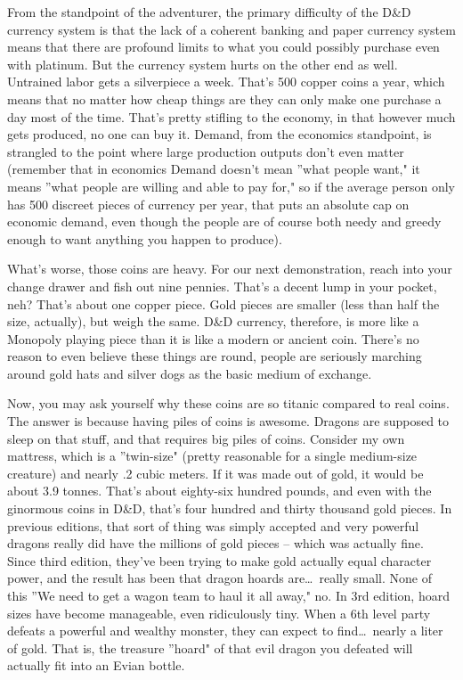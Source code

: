 From the standpoint of the adventurer, the primary difficulty of the D\&D currency system is that the lack of a coherent banking and paper currency system means that there are profound limits to what you could possibly purchase even with platinum. But the currency system hurts on the other end as well. Untrained labor gets a silverpiece a week. That's 500 copper coins a year, which means that no matter how cheap things are they can only make one purchase a day most of the time. That's pretty stifling to the economy, in that however much gets produced, no one can buy it. Demand, from the economics standpoint, is strangled to the point where large production outputs don't even matter (remember that in economics Demand doesn't mean ''what people want," it means ''what people are willing and able to pay for," so if the average person only has 500 discreet pieces of currency per year, that puts an absolute cap on economic demand, even though the people are of course both needy and greedy enough to want anything you happen to produce).

What's worse, those coins are heavy. For our next demonstration, reach into your change drawer and fish out nine pennies. That's a decent lump in your pocket, neh? That's about one copper piece. Gold pieces are smaller (less than half the size, actually), but weigh the same. D\&D currency, therefore, is more like a Monopoly playing piece than it is like a modern or ancient coin. There's no reason to even believe these things are round, people are seriously marching around gold hats and silver dogs as the basic medium of exchange.

Now, you may ask yourself why these coins are so titanic compared to real coins. The answer is because having piles of coins is awesome. Dragons are supposed to sleep on that stuff, and that requires big piles of coins. Consider my own mattress, which is a ''twin-size" (pretty reasonable for a single medium-size creature) and nearly .2 cubic meters. If it was made out of gold, it would be about 3.9 tonnes. That's about eighty-six hundred pounds, and even with the ginormous coins in D\&D, that's four hundred and thirty thousand gold pieces. In previous editions, that sort of thing was simply accepted and very powerful dragons really did have the millions of gold pieces -- which was actually fine. Since third edition, they've been trying to make gold actually equal character power, and the result has been that dragon hoards are\ldots\  really small. None of this ''We need to get a wagon team to haul it all away," no. In 3rd edition, hoard sizes have become manageable, even ridiculously tiny. When a 6th level party defeats a powerful and wealthy monster, they can expect to find\ldots\  nearly a liter of gold. That is, the treasure ''hoard" of that evil dragon you defeated will actually fit into an Evian bottle.

